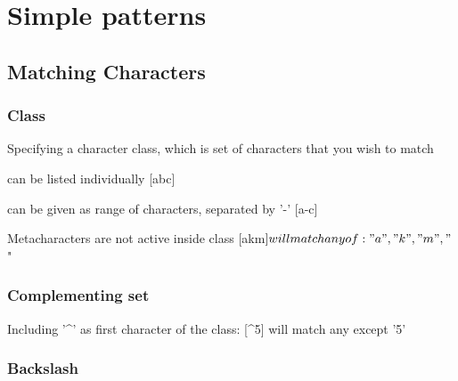 \documentclass{beamer}
\begin{document}
\section{Simple patterns}
\subsection{Matching Characters}

\subsubsection{Class}
\begin{frame}
[ ]
Specifying a character class, which is set of characters that you wish to match
\item can be listed individually [abc]
\item can be given as range of characters, separated by '-' [a-c]
\end{frame}
\pause
Metacharacters are not active inside class
[akm$] will match any of: "a", "k", "m", "$"

\subsubsection{Complementing set}
\begin{frame}
[^5]
Including '^' as first character of the class: [^5] will match any except '5'
\end{frame}

\subsubsection{Backslash}
\begin{frame}
* escape metacharacters
For matching "[" or "\" you can use "\[" or "\\"
\end{frame}
\end{document}
